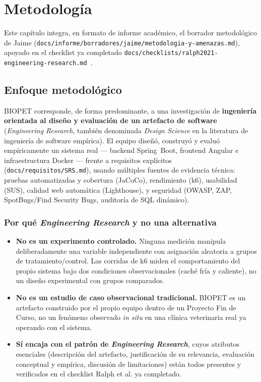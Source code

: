 \chapter{Metodolog\'ia}
\label{cap:metodologia}

Este cap\'itulo integra, en formato de informe acad\'emico, el borrador
metodol\'ogico de Jaime (\texttt{docs/informe/borradores/jaime/metodologia-y-amenazas.md}),
apoyado en el checklist ya completado
\texttt{docs/checklists/ralph2021-engineering-research.md}~\cite{ralph2021-empirical-standards}.

\section{Enfoque metodol\'ogico}

BIOPET corresponde, de forma predominante, a una investigaci\'on de
\textbf{ingenier\'ia orientada al dise\~no y evaluaci\'on de un artefacto de
software} (\emph{Engineering Research}, tambi\'en denominada \emph{Design
Science} en la literatura de ingenier\'ia de software emp\'irica). El
equipo dise\~n\'o, construy\'o y evalu\'o emp\'iricamente un sistema real
--- backend Spring~Boot, frontend Angular e infraestructura Docker ---
frente a requisitos expl\'icitos (\texttt{docs/requisitos/SRS.md}), usando
m\'ultiples fuentes de evidencia t\'ecnica: pruebas automatizadas y
cobertura (JaCoCo), rendimiento (k6), usabilidad (SUS), calidad web
autom\'atica (Lighthouse), y seguridad (OWASP, ZAP, SpotBugs/Find Security
Bugs, auditor\'ia de SQL din\'amico).

\subsection*{Por qu\'e \emph{Engineering Research} y no una alternativa}
\begin{itemize}[nosep]
  \item \textbf{No es un experimento controlado.} Ninguna medici\'on
    manipula deliberadamente una variable independiente con asignaci\'on
    aleatoria a grupos de tratamiento/control. Las corridas de k6 miden el
    comportamiento del propio sistema bajo dos condiciones observacionales
    (cach\'e fr\'ia y caliente), no un dise\~no experimental con grupos
    comparados.
  \item \textbf{No es un estudio de caso observacional tradicional.} BIOPET
    es un artefacto construido por el propio equipo dentro de un Proyecto
    Fin de Curso, no un fen\'omeno observado \emph{in situ} en una
    cl\'inica veterinaria real ya operando con el sistema.
  \item \textbf{S\'i encaja con el patr\'on de \emph{Engineering
    Research}}, cuyos atributos esenciales (descripci\'on del artefacto,
    justificaci\'on de su relevancia, evaluaci\'on conceptual y emp\'irica,
    discusi\'on de limitaciones) est\'an todos presentes y verificados en
    el checklist Ralph et al. ya completado.
\end{itemize}

